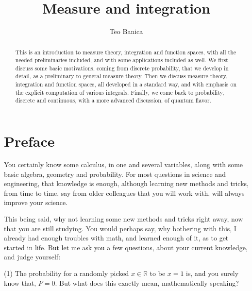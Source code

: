 \documentclass[12pt]{amsbook}
\begin{document}
\title{Measure and integration}

\author{Teo Banica}
\address{Department of Mathematics, University of Cergy-Pontoise, F-95000 Cergy-Pontoise, France. {\tt teo.banica@gmail.com}}


\begin{abstract}
This is an introduction to measure theory, integration and function spaces, with all the needed preliminaries included, and with some applications included as well. We first discuss some basic motivations, coming from discrete probability, that we develop in detail, as a preliminary to general measure theory. Then we discuss measure theory, integration and function spaces, all developed in a standard way, and with emphasis on the explicit computation of various integrals. Finally, we come back to probability, discrete and continuous, with a more advanced discussion, of quantum flavor.
\end{abstract}

\maketitle

\chapter*{Preface}

You certainly know some calculus, in one and several variables, along with some basic algebra, geometry and probability. For most questions in science and engineering, that knowledge is enough, although learning new methods and tricks, from time to time, say from older colleagues that you will work with, will always improve your science.

\bigskip

This being said, why not learning some new methods and tricks right away, now that you are still studying. You would perhaps say, why bothering with this, I already had enough troubles with math, and learned enough of it, as to get started in life. But let me ask you a few questions, about your current knowledge, and judge yourself:

\bigskip

(1) The probability for a randomly picked $x\in\mathbb R$ to be $x=1$ is, and you surely know that, $P=0$. But what does this exactly mean, mathematically speaking?
\end{document}

